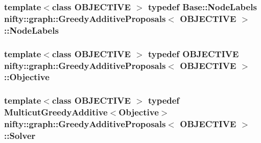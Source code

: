 \subsubsection[{Node\+Labels}]{\setlength{\rightskip}{0pt plus 5cm}template$<$class O\+B\+J\+E\+C\+T\+I\+V\+E $>$ typedef {\bf Base\+::\+Node\+Labels} {\bf nifty\+::graph\+::\+Greedy\+Additive\+Proposals}$<$ O\+B\+J\+E\+C\+T\+I\+V\+E $>$\+::{\bf Node\+Labels}}\label{classnifty_1_1graph_1_1GreedyAdditiveProposals_aeec70a0521e576f19b603759f4e67ff4}
\hypertarget{classnifty_1_1graph_1_1GreedyAdditiveProposals_a678640a8ae0ec9d3f7cf3df4fab0ccd6}{}
\subsubsection[{Objective}]{\setlength{\rightskip}{0pt plus 5cm}template$<$class O\+B\+J\+E\+C\+T\+I\+V\+E $>$ typedef O\+B\+J\+E\+C\+T\+I\+V\+E {\bf nifty\+::graph\+::\+Greedy\+Additive\+Proposals}$<$ O\+B\+J\+E\+C\+T\+I\+V\+E $>$\+::{\bf Objective}}\label{classnifty_1_1graph_1_1GreedyAdditiveProposals_a678640a8ae0ec9d3f7cf3df4fab0ccd6}
\hypertarget{classnifty_1_1graph_1_1GreedyAdditiveProposals_aa17e097066aa4843f58f9ae238d6780d}{}
\subsubsection[{Solver}]{\setlength{\rightskip}{0pt plus 5cm}template$<$class O\+B\+J\+E\+C\+T\+I\+V\+E $>$ typedef {\bf Multicut\+Greedy\+Additive}$<${\bf Objective}$>$ {\bf nifty\+::graph\+::\+Greedy\+Additive\+Proposals}$<$ O\+B\+J\+E\+C\+T\+I\+V\+E $>$\+::{\bf Solver}}\label{classnifty_1_1graph_1_1GreedyAdditiveProposals_aa17e097066aa4843f58f9ae238d6780d}
\hypertarget{classnifty_1_1graph_1_1GreedyAdditiveProposals_a5e0d6650fd55809c376a1f3b550e9d65}{}
